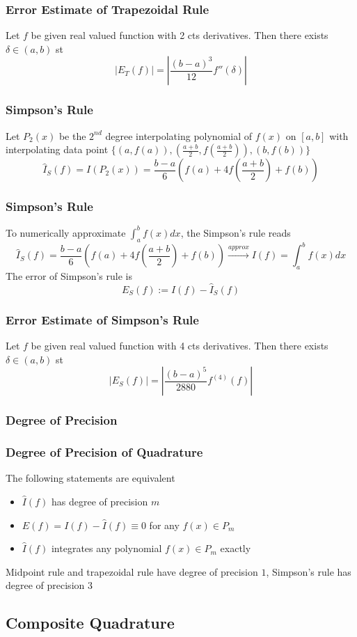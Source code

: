 \documentclass[11pt]{article}
\newcommand{\ds}{\displaystyle}
\begin{document}
\subsubsection*{Error Estimate of Trapezoidal Rule}
Let $f$ be given real valued function with 2 cts derivatives. Then there exists $\delta\in(a,b)$ st 
\[|E_T(f)|=|\dfrac{(b-a)^3}{12}f''(\delta)|\] 
\subsubsection{Simpson's Rule}
Let $P_2(x)$ be the $2^{nd}$ degree interpolating polynomial of $f(x)$ on $[a,b]$ with interpolating data point $\{(a,f(a)),(\frac{a+b}{2}, f(\frac{a+b}{2})), (b,f(b))\}$
\[\hat{I}_S(f) = I(P_2(x)) = \frac{b-a}{6}(f(a)+4f(\frac{a+b}{2})+f(b))\]
\subsubsection*{Simpson's Rule}
To numerically approximate $\ds\int_{a}^{b}f(x)dx$, the Simpson's rule reads
\[\hat{I}_S(f) = \frac{b-a}{6}(f(a)+4f(\frac{a+b}{2})+f(b))\xrightarrow[]{approx}I(f)=\int_{a}^{b}f(x)dx\]
The error of Simpson's rule is
\[E_S(f):= I(f)-\hat{I}_S(f)\]
\subsubsection*{Error Estimate of Simpson's Rule}
Let $f$ be given real valued function with 4 cts derivatives. Then there exists $\delta\in(a,b)$ st
\[|E_S(f)| = |\frac{(b-a)^5}{2880}f^{(4)}(f)|\]
\subsubsection{Degree of Precision}
\subsubsection*{Degree of Precision of Quadrature}
The following statements are equivalent
\begin{itemize}
  \item $\hat{I}(f)$ has degree of precision $m$
  \item $E(f)=I(f)-\hat{I}(f)\equiv0$ for any $f(x)\in P_m$
  \item $\hat{I}(f)$ integrates any polynomial $f(x)\in P_m$ exactly
\end{itemize}
Midpoint rule and trapezoidal rule have degree of precision $1$, Simpson's rule has degree of precision $3$
\subsection{Composite Quadrature}
\end{document}
